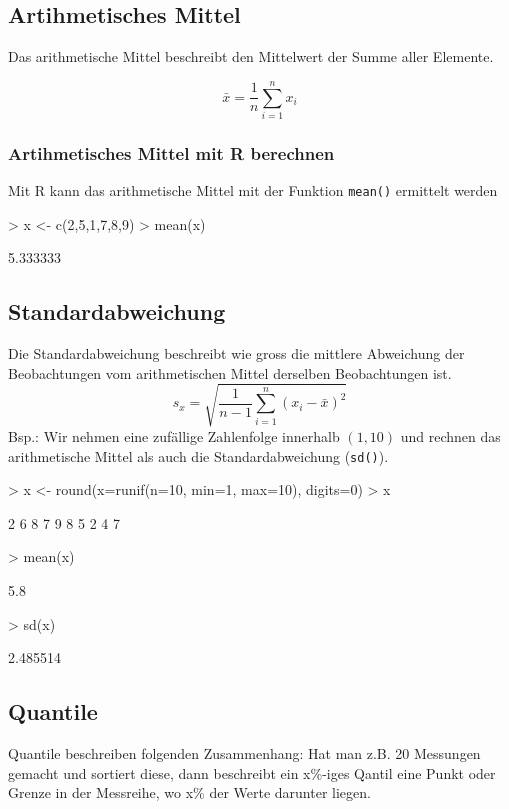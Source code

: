 \subsection{Artihmetisches Mittel}
Das arithmetische Mittel beschreibt den Mittelwert der Summe aller Elemente.

\[ \bar{x} = \frac{1}{n} \sum\limits_{i=1}^{n} x_i \]

\subsubsection{Artihmetisches Mittel mit R berechnen}
Mit R kann das arithmetische Mittel mit der Funktion \verb!mean()! 
ermittelt werden
\begin{Schunk}
\begin{Sinput}
> x <- c(2,5,1,7,8,9)
> mean(x)
\end{Sinput}
\begin{Soutput}
[1] 5.333333
\end{Soutput}
\end{Schunk}

\subsection{Standardabweichung}
Die Standardabweichung beschreibt wie gross die mittlere Abweichung der
Beobachtungen vom arithmetischen Mittel derselben Beobachtungen ist.
\[ s_x = \sqrt{ \frac{1}{n-1} \sum\limits_{i=1}^{n} (x_i - \bar{x})^2 } \]
Bsp.: Wir nehmen eine zufällige Zahlenfolge innerhalb $(1,10)$ und
rechnen das arithmetische Mittel als auch die Standardabweichung (\verb!sd()!).
\begin{Schunk}
\begin{Sinput}
> x <- round(x=runif(n=10, min=1, max=10), digits=0)
> x
\end{Sinput}
\begin{Soutput}
 [1] 2 6 8 7 9 8 5 2 4 7
\end{Soutput}
\begin{Sinput}
> mean(x)
\end{Sinput}
\begin{Soutput}
[1] 5.8
\end{Soutput}
\begin{Sinput}
> sd(x)
\end{Sinput}
\begin{Soutput}
[1] 2.485514
\end{Soutput}
\end{Schunk}

\subsection{Quantile}
Quantile beschreiben folgenden Zusammenhang: Hat man z.B. 20 Messungen gemacht
und sortiert diese, dann beschreibt ein x\%-iges Qantil eine Punkt oder Grenze
in der Messreihe, wo x\% der Werte darunter liegen.

